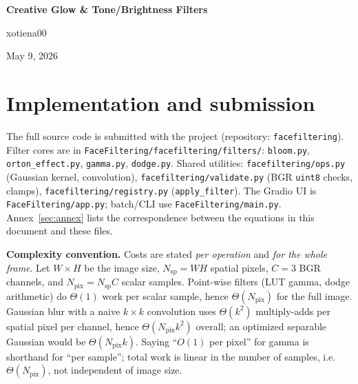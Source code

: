 \documentclass[11pt,a4paper]{article}
\begin{document}
\begin{center}
{\LARGE\bfseries Creative Glow \& Tone/Brightness Filters\par}
\vspace{2pt}
{\large xotiena00\par}
\vspace{2pt}
{May 9, 2026\par}
\end{center}
\vspace{6pt}

\section{Implementation and submission}\label{sec:impl}
The full source code is submitted with the project (repository: \texttt{facefiltering}). Filter cores are in \texttt{FaceFiltering/facefiltering/filters/}: \texttt{bloom.py}, \texttt{orton\_effect.py}, \texttt{gamma.py}, \texttt{dodge.py}. Shared utilities: \texttt{facefiltering/ops.py} (Gaussian kernel, convolution), \texttt{facefiltering/validate.py} (BGR \texttt{uint8} checks, clamps), \texttt{facefiltering/registry.py} (\texttt{apply\_filter}). The Gradio UI is \texttt{FaceFiltering/app.py}; batch/CLI use \texttt{FaceFiltering/main.py}. Annex~\ref{sec:annex} lists the correspondence between the equations in this document and these files.

\textbf{Complexity convention.} Costs are stated \emph{per operation} and \emph{for the whole frame}. Let $W\times H$ be the image size, $N_{\mathrm{sp}}=WH$ spatial pixels, $C=3$ BGR channels, and $N_{\mathrm{pix}}=N_{\mathrm{sp}}C$ scalar samples. Point-wise filters (LUT gamma, dodge arithmetic) do $\Theta(1)$ work per scalar sample, hence $\Theta(N_{\mathrm{pix}})$ for the full image. Gaussian blur with a naive $k\times k$ convolution uses $\Theta(k^2)$ multiply-adds per spatial pixel per channel, hence $\Theta(N_{\mathrm{pix}}k^2)$ overall; an optimized separable Gaussian would be $\Theta(N_{\mathrm{pix}}k)$. Saying ``\(O(1)\) per pixel'' for gamma is shorthand for ``per sample''; total work is linear in the number of samples, i.e.\ \(\Theta(N_{\mathrm{pix}})\), not independent of image size.
\end{document}
